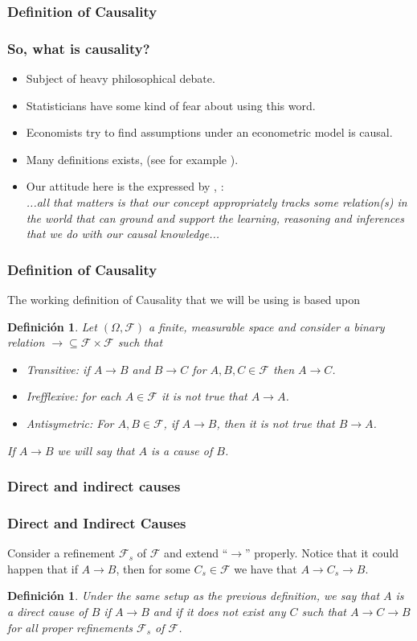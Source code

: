 \documentclass{beamer}
\theoremstyle{plain}
\newtheorem{defi}[teo]{Definición}
\begin{document}
		\subsubsection{Definition of Causality}
		\begin{frame}
		\frametitle{So, what is causality?}
		\begin{itemize}
		\item Subject of heavy philosophical debate.
		\item Statisticians have some kind of fear about using this word.
		\item Economists try to find assumptions under an econometric model is causal.
		\item Many definitions exists, (see for example \cite{arlo2016readings}).
		\item Our attitude here is the expressed by \cite{danks2013functions}, \cite{danks2014unifying}:\\
		\textit{...all that matters is that our concept appropriately tracks some relation(s) in the world that can ground and support the learning, reasoning and inferences that we do with our causal knowledge...}
		\end{itemize}
		\end{frame}
		\begin{frame}
		\frametitle{Definition of Causality}
		The working definition of Causality that we will be using is based upon \cite{spirtes2000causation}
		\begin{defi}
		Let $(\Omega, \mathcal{F})$ a finite, measurable space and consider a binary relation  $\to  \subseteq \mathcal{F} \times \mathcal{F}$ such that
		\begin{itemize}
		\item Transitive: if $A \to B$ and $B \to C$ for $A,B,C \in \mathcal{F}$ then $A \to C$.
		\item  Irefflexive: for each $A \in \mathcal{F}$ it is not true that $A \to A$.
		\item Antisymetric: For $A, B \in \mathcal{F}$, if $A \to B$, then it is not true that $B \to A$.
		\end{itemize}
		If $A \to B$ we will say that $A$ is a cause of $B$.
		\end{defi}
		\end{frame}
		\subsubsection{Direct and indirect causes}
		\begin{frame}
		\frametitle{Direct and Indirect Causes}
		Consider a refinement $\mathcal{F}_s$ of $\mathcal{F}$ and extend “$\to$” properly. Notice that it could happen that if $A \to B$, then for some $C_s \in \mathcal{F}$ we have that $A \to C_s \to B$. 
		\begin{defi}
		Under the same setup as the previous definition, we say that $A$ is a direct cause of $B$ if $A \to B$ and if it does not exist any $C$ such that $A \to C \to B$ for all proper refinements $\mathcal{F}_s$ of $\mathcal{F}$.
		\end{defi}
		\end{frame}
\end{document}
